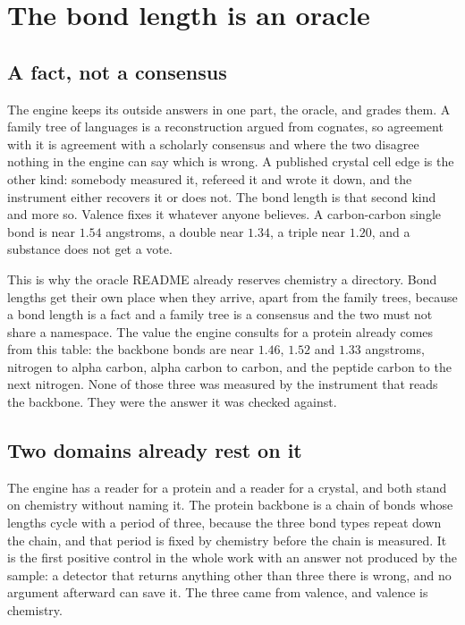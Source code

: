 \chapter{The bond length is an oracle}

\section{A fact, not a consensus}

The engine keeps its outside answers in one part, the oracle, and grades them. A family tree of
languages is a reconstruction argued from cognates, so agreement with it is agreement with a
scholarly consensus and where the two disagree nothing in the engine can say which is wrong. A
published crystal cell edge is the other kind: somebody measured it, refereed it and wrote it down,
and the instrument either recovers it or does not. The bond length is that second kind and more so.
Valence fixes it whatever anyone believes. A carbon-carbon single bond is near $1.54$ angstroms, a
double near $1.34$, a triple near $1.20$, and a substance does not get a vote.

This is why the oracle README already reserves chemistry a directory. Bond lengths get their own
place when they arrive, apart from the family trees, because a bond length is a fact and a family
tree is a consensus and the two must not share a namespace. The value the engine consults for a
protein already comes from this table: the backbone bonds are near $1.46$, $1.52$ and $1.33$
angstroms, nitrogen to alpha carbon, alpha carbon to carbon, and the peptide carbon to the next
nitrogen. None of those three was measured by the instrument that reads the backbone. They were the
answer it was checked against.

\section{Two domains already rest on it}

The engine has a reader for a protein and a reader for a crystal, and both stand on chemistry without
naming it. The protein backbone is a chain of bonds whose lengths cycle with a period of three,
because the three bond types repeat down the chain, and that period is fixed by chemistry before the
chain is measured. It is the first positive control in the whole work with an answer not produced by
the sample: a detector that returns anything other than three there is wrong, and no argument
afterward can save it. The three came from valence, and valence is chemistry.

